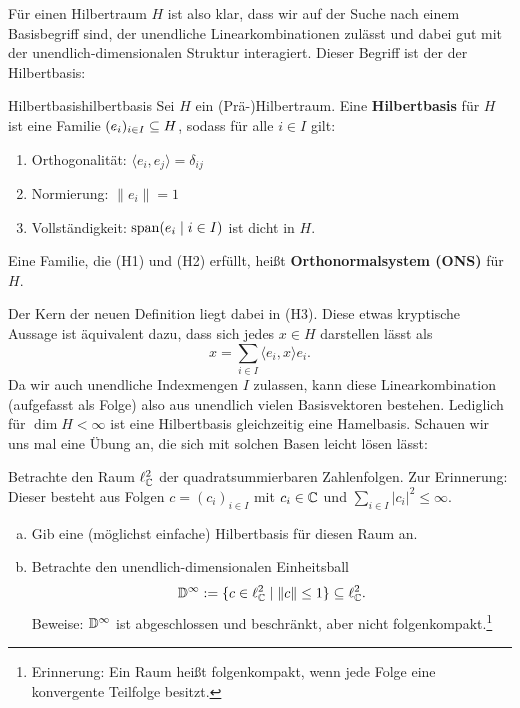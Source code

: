 Für einen Hilbertraum $H$ ist also klar, dass wir auf der Suche nach einem Basisbegriff sind, der unendliche Linearkombinationen zulässt und dabei gut mit der unendlich-dimensionalen Struktur interagiert. Dieser Begriff ist der der Hilbertbasis:
\begin{definition}{Hilbertbasis}{hilbertbasis}
Sei $H$ ein (Prä-)Hilbertraum. Eine \textbf{Hilbertbasis} für $H$ ist eine Familie $(e_i)_{i \in I} \subseteq H$, sodass für alle $i \in I$ gilt:
\begin{enumerate}[({H}1)]
	\item Orthogonalität: $\langle e_i, e_j \rangle = \delta_{ij}$
	\item Normierung: $\|e_i\| = 1$
	\item Vollständigkeit: $\spn(e_i \mid i \in I)$ ist dicht in $H$.
\end{enumerate}
Eine Familie, die (H1) und (H2) erfüllt, heißt \textbf{Orthonormalsystem (ONS)} für $H$.
\end{definition}
Der Kern der neuen Definition liegt dabei in (H3). Diese etwas kryptische Aussage ist äquivalent dazu, dass sich jedes $x \in H$ darstellen lässt als
\begin{equation}
x = \sum_{i \in I} \langle e_i, x \rangle e_i.
\end{equation}
Da wir auch unendliche Indexmengen $I$ zulassen, kann diese Linearkombination (aufgefasst als Folge) also aus unendlich vielen Basisvektoren bestehen.  Lediglich für $\dim H < \infty$ ist eine Hilbertbasis gleichzeitig eine Hamelbasis. Schauen wir uns mal eine Übung an, die sich mit solchen Basen leicht lösen lässt:
\begin{übung}
Betrachte den Raum $\ell^2_{\mathbb{C}}$ der quadratsummierbaren Zahlenfolgen. Zur Erinnerung: Dieser besteht aus Folgen $ c = (c_i)_{i \in I}$ mit $c_i \in \mathbb{C}$ und $\sum_{i \in I} |c_i|^2 \leq \infty$.
\begin{enumerate}[a)]
\item Gib eine (möglichst einfache) Hilbertbasis für diesen Raum an.
\item Betrachte den unendlich-dimensionalen Einheitsball
$$
\mathbb{D}^\infty := \{ c \in \ell^2_{\mathbb{C}} \mid \|c\| \leq 1\} \subseteq \ell^2_{\mathbb{C}}.
$$
Beweise: $\mathbb{D}^\infty$ ist abgeschlossen und beschränkt, aber nicht folgenkompakt.\footnote{Erinnerung: Ein Raum heißt folgenkompakt, wenn jede Folge eine konvergente Teilfolge besitzt.}
\end{enumerate}
\end{übung}
